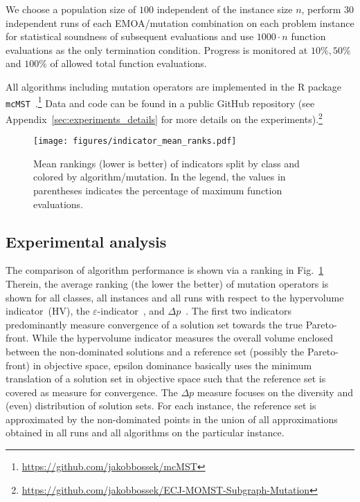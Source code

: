 \documentclass[twoside]{article}
\begin{document}
We choose a population size of $100$ independent of the instance size $n$, perform $30$ independent runs of each EMOA/mutation combination on each problem instance for statistical soundness of subsequent evaluations and use $1000 \cdot n$ function evaluations as the only termination condition. Progress is monitored at $10\%, 50\%$ and $100\%$ of allowed total function evaluations. 

All algorithms including mutation operators are implemented in the R package \texttt{mcMST}~\citep{Bo17}.\footnote{\url{https://github.com/jakobbossek/mcMST}} 
Data and code can be found in a public GitHub repository (see Appendix~\ref{sec:experiments_details} for more details on the experiments).\footnote{\url{https://github.com/jakobbossek/ECJ-MOMST-Subgraph-Mutation}}

\begin{figure}[t]
    \centering
    \texttt{[image: figures/indicator\_mean\_ranks.pdf]}
    \caption{Mean rankings (lower is better) of indicators split by class and colored by algorithm/mutation. In the legend, the values in parentheses indicates the percentage of maximum function evaluations.}
    \label{fig:indicator_mean_ranks}
\end{figure}

\subsection{Experimental analysis}

The comparison of algorithm performance
is shown via a ranking in Fig.~\ref{fig:indicator_mean_ranks} Therein, the average ranking (the lower the better) of mutation operators is shown for all classes, all instances and all runs with respect to the hypervolume indicator~(HV), the $\varepsilon$-indicator~\citep{ZTLF03}, and $\Delta p$~\citep{SELC12}. The first two indicators predominantly measure convergence of a solution set towards the true Pareto-front. While the hypervolume indicator measures the overall volume enclosed between the non-dominated solutions and a reference set (possibly the Pareto-front) in objective space, epsilon dominance basically uses the minimum translation of a solution set in objective space such that the reference set is covered as measure for convergence. The $\Delta p$ measure focuses on the diversity and (even) distribution of solution sets. For each instance, the reference set is approximated by the non-dominated points in the union of all approximations obtained in all runs and all algorithms on the particular instance.
\end{document}
